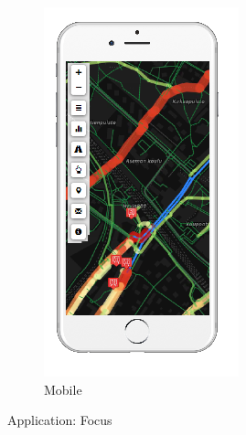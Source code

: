 \begin{figure}[ht]
\begin{subfigure}[b]{0.2\textwidth}
        \includegraphics[width=\textwidth]
          {img/c03-merge/png/mobile-basemap-merge.png}
        \caption{Mobile}
    \end{subfigure}
    \caption{Application: Focus}
\end{figure}